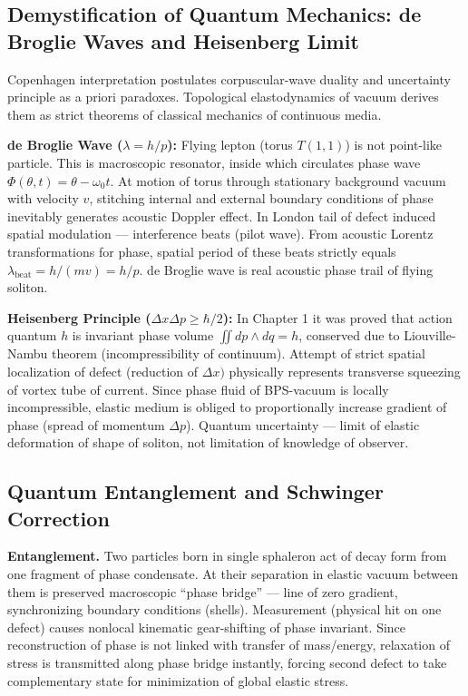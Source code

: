 \documentclass[12pt,a4paper]{article}
\begin{document}
\subsection{Demystification of Quantum Mechanics: de Broglie Waves and Heisenberg Limit}
Copenhagen interpretation postulates corpuscular-wave duality and uncertainty principle as a priori paradoxes. Topological elastodynamics of vacuum derives them as strict theorems of classical mechanics of continuous media.

\textbf{de Broglie Wave ($\lambda = h/p$):} Flying lepton (torus $T(1,1)$) is not point-like particle. This is macroscopic resonator, inside which circulates phase wave $\Phi(\theta,t) = \theta - \omega_0 t$. At motion of torus through stationary background vacuum with velocity $v$, stitching internal and external boundary conditions of phase inevitably generates acoustic Doppler effect. In London tail of defect induced spatial modulation --- interference beats (pilot wave). From acoustic Lorentz transformations for phase, spatial period of these beats strictly equals $\lambda_{\text{beat}} = h/(mv) = h/p$. de Broglie wave is real acoustic phase trail of flying soliton.

\textbf{Heisenberg Principle ($\Delta x \Delta p \geq \hbar/2$):} In Chapter 1 it was proved that action quantum $h$ is invariant phase volume $\iint dp \wedge dq = h$, conserved due to Liouville-Nambu theorem (incompressibility of continuum). Attempt of strict spatial localization of defect (reduction of $\Delta x)$ physically represents transverse squeezing of vortex tube of current. Since phase fluid of BPS-vacuum is locally incompressible, elastic medium is obliged to proportionally increase gradient of phase (spread of momentum $\Delta p$). Quantum uncertainty --- limit of elastic deformation of shape of soliton, not limitation of knowledge of observer.

\subsection{Quantum Entanglement and Schwinger Correction}
\textbf{Entanglement.} Two particles born in single sphaleron act of decay form from one fragment of phase condensate. At their separation in elastic vacuum between them is preserved macroscopic ``phase bridge'' --- line of zero gradient, synchronizing boundary conditions (shells). Measurement (physical hit on one defect) causes nonlocal kinematic gear-shifting of phase invariant. Since reconstruction of phase is not linked with transfer of mass/energy, relaxation of stress is transmitted along phase bridge instantly, forcing second defect to take complementary state for minimization of global elastic stress.
\end{document}
